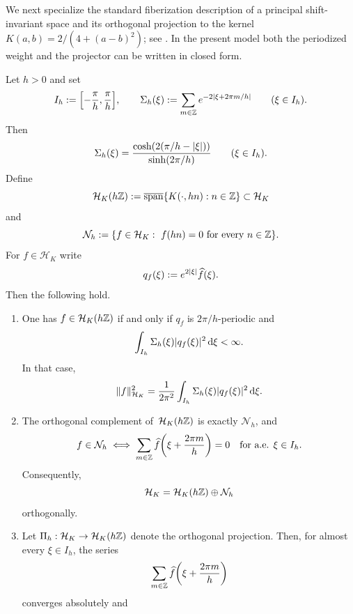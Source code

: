 We next specialize the standard fiberization description of a principal
shift-invariant space and its orthogonal projection to the kernel
$K(a,b)=2/(4+(a-b)^2)$; see
\cite{deBoorDeVoreRon1994,RonShen1995,AldroubiGrochenig2001}.  In the
present model both the periodized weight and the projector can be
written in closed form.

\begin{theorem}\label{thm:uniform-lattice-projection}
Let $h>0$ and set
\[
I_h:=\Bigl[-\frac{\pi}{h},\frac{\pi}{h}\Bigr],
\qquad
\Sigma_h(\xi):=\sum_{m\in\mathbb{Z}}e^{-2\lvert \xi+2\pi m/h\rvert}
\qquad(\xi\in I_h).
\]
Then
\begin{equation}\label{eq:lattice-periodized-weight}
\Sigma_h(\xi)
=\frac{\cosh(2(\pi/h-\lvert \xi\rvert))}{\sinh(2\pi/h)}
\qquad(\xi\in I_h).
\end{equation}
Define
\[
\mathcal H_K(h\mathbb{Z})
:=
\overline{\operatorname{span}}\{K(\cdot,hn):n\in\mathbb{Z}\}
\subset\mathcal H_K
\]
and
\[
\mathcal N_h
:=
\{f\in\mathcal H_K:\ f(hn)=0\ \text{for every }n\in\mathbb{Z}\}.
\]
For $f\in\mathcal H_K$ write
\[
q_f(\xi):=e^{2\lvert \xi\rvert}\widehat f(\xi).
\]
Then the following hold.
\begin{enumerate}[label=(\roman*)]
\item
      One has $f\in\mathcal H_K(h\mathbb{Z})$ if and only if $q_f$ is
      $2\pi/h$-periodic and
      \[
      \int_{I_h}\Sigma_h(\xi)\lvert q_f(\xi)\rvert^2\,\mathrm{d}\xi<\infty.
      \]
      In that case,
      \begin{equation}\label{eq:lattice-subspace-norm}
      \|f\|_{\mathcal H_K}^2
      =\frac{1}{2\pi^2}\int_{I_h}\Sigma_h(\xi)\lvert q_f(\xi)\rvert^2\,\mathrm{d}\xi.
      \end{equation}
\item
      The orthogonal complement of~$\mathcal H_K(h\mathbb{Z})$ is exactly
      $\mathcal N_h$, and
      \begin{equation}\label{eq:lattice-alias-cancellation}
      f\in\mathcal N_h
      \iff
      \sum_{m\in\mathbb{Z}}\widehat f\!\left(\xi+\frac{2\pi m}{h}\right)=0
      \quad\text{for a.e. }\xi\in I_h.
      \end{equation}
      Consequently,
      \[
      \mathcal H_K=\mathcal H_K(h\mathbb{Z})\oplus \mathcal N_h
      \]
      orthogonally.
\item
      Let $\Pi_h:\mathcal H_K\to\mathcal H_K(h\mathbb{Z})$ denote the orthogonal
      projection.  Then, for almost every $\xi\in I_h$, the series
      \[
      \sum_{m\in\mathbb{Z}}\widehat f\!\left(\xi+\frac{2\pi m}{h}\right)
      \]
      converges absolutely and
      \begin{equation}\label{eq:lattice-alias-projection}

\end{equation}
\end{enumerate}
\end{theorem}
